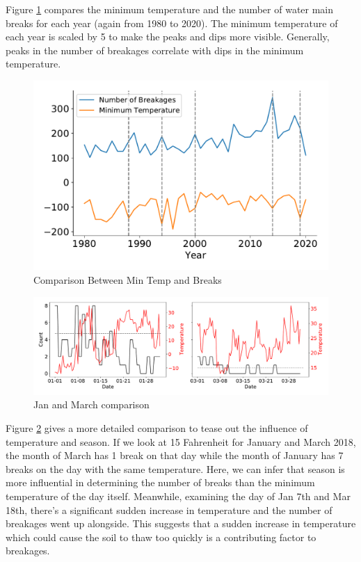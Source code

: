 \documentclass[twocolumn]{article}
\begin{document}
Figure \ref{fig:min temp and counts} compares the minimum temperature and the number of water main breaks for each year (again from 1980 to 2020). The minimum temperature of each year is scaled by 5 to make the peaks and dips more visible. Generally, peaks in the number of breakages correlate with dips in the minimum temperature. 

\begin{figure}[H]
    \includegraphics[width = \columnwidth]{Wen/min temp and count comparison.pdf}
    \caption{Comparison Between Min Temp and Breaks}
    \label{fig:min temp and counts}
\end{figure}

\begin{figure}
    \includegraphics[width = \textwidth]{Wen/jan mar 2018 comparison.pdf}
    \caption{Jan and March comparison}
    \label{fig:comparison}
\end{figure}

Figure \ref{fig:comparison} gives a more detailed comparison to tease out the influence of temperature and season. If we look at 15 Fahrenheit for January and March 2018, the month of March has 1 break on that day while the month of January has 7 breaks on the day with the same temperature. Here, we can infer that season is more influential in determining the number of breaks than the minimum temperature of the day itself. Meanwhile, examining the day of Jan 7th and Mar 18th, there's a significant sudden increase in temperature and the number of breakages went up alongside. This suggests that a sudden increase in temperature which could cause the soil to thaw too quickly is a contributing factor to breakages. 
\end{document}
